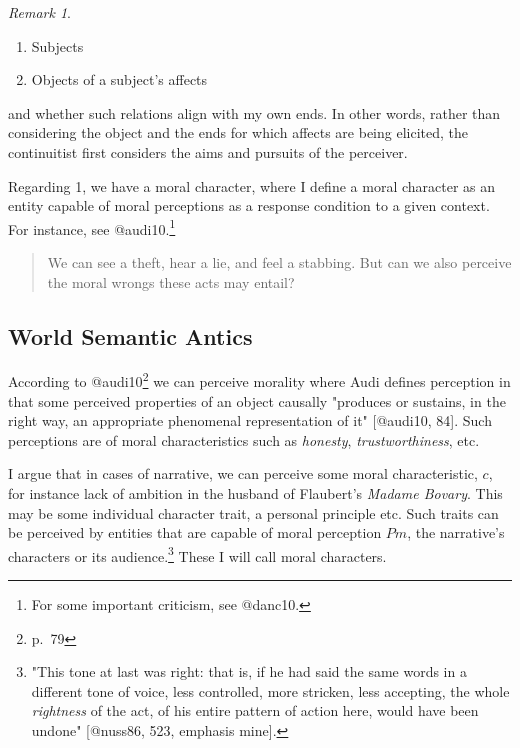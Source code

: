 \documentclass[
  letterpaper,
  DIV=11,
  numbers=noendperiod]{scrartcl}
\providecommand{\tightlist}{%
  \setlength{\itemsep}{0pt}\setlength{\parskip}{0pt}}
\theoremstyle{remark}
\newtheorem*{remark}{Remark}
\begin{document}
\begin{remark}
\leavevmode

\begin{enumerate}
\def\labelenumi{\arabic{enumi}.}
\tightlist
\item
  Subjects
\item
  Objects of a subject's affects
\end{enumerate}

\end{remark}

\noindent and whether such relations align with my own ends. In other
words, rather than considering the object and the ends for which affects
are being elicited, the continuitist first considers the aims and
pursuits of the perceiver.

Regarding 1, we have a moral character, where I define a moral character
as an entity capable of moral perceptions as a response condition to a
given context. For instance, see @audi10.\footnote{For some important
  criticism, see @danc10.}

\begin{quote}
We can see a theft, hear a lie, and feel a stabbing. But can we also
perceive the moral wrongs these acts may entail?
\end{quote}

\subsection{World Semantic Antics}\label{world-semantic-antics}

According to @audi10\footnote{p.~79} we can perceive morality where Audi
defines perception in that some perceived properties of an object
causally "produces or sustains, in the right way, an appropriate
phenomenal representation of it" {[}@audi10, 84{]}. Such perceptions are
of moral characteristics such as \emph{honesty}, \emph{trustworthiness},
etc.

I argue that in cases of narrative, we can perceive some moral
characteristic, \(c\), for instance lack of ambition in the husband of
Flaubert's \emph{Madame Bovary}. This may be some individual character
trait, a personal principle etc. Such traits can be perceived by
entities that are capable of moral perception \(Pm\), the narrative's
characters or its audience.\footnote{"\textquotesingle This tone at last
  was right\textquotesingle: that is, if he had said the same words in a
  different tone of voice, less controlled, more stricken, less
  accepting, the whole \emph{rightness} of the act, of his entire
  pattern of action here, would have been undone" {[}@nuss86, 523,
  emphasis mine{]}.} These I will call moral characters.
\end{document}
